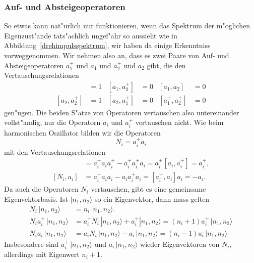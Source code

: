 \subsubsection{Auf- und Absteigeoperatoren}
So etwas kann nat"urlich nur funktionieren, wenn das Spektrum der
m"oglichen Eigenzust"ande tats"achlich ungef"ahr so aussieht wie in
Abbildung~\ref{drehimpulsspektrum}, wir haben da einige Erkenntniss
vorweggenommen.
Wir nehmen also an, dass es zwei Paare von Auf- und Absteigeoperatoren
$a_1^+$ und $a_1$ und $a_2^+$ und $a_2$ gibt, die den Vertauschungsrelationen
\begin{align*}
[a_1,a_1^+]&=1&[a_1,a_2^+]&=0&[a_1,a_2]&=0\\
[a_2,a_2^+]&=1&[a_2,a_1^+]&=0&[a_1^+,a_2^+]&=0
\end{align*}
gen"ugen.
Die beiden S"atze von Operatoren vertauschen also untereinander
vollst"andig, nur die Operatorn $a_i$ und $a_i^+$ vertauschen nicht.
Wie beim harmonischen Oszillator bilden wir die Operatoren
\[
N_i=a_i^+a_i
\]
mit den Vertauschungsrelationen
\begin{align*}
[N_i,a_i^+]
&=
a_i^+a_ia_i^+-a_i^+a_i^+a_i
=
a_i^+[a_i,a_i^+]
=
a_i^+,
\\
[N_i,a_i]
&=
a_i^+a_ia_i- a_ia_i^+a_i
=
[a_i^+,a_i]a_i
=
-a_i.
\end{align*}
Da auch die Operatoren $N_i$ vertauschen, gibt es eine gemeinsame
Eigenvektorbasis. Ist $|n_1,n_2\rangle$ so ein Eigenvektor, dann muss
gelten
\begin{align*}
N_i\,|n_1,n_2\rangle
&=
n_i\,|n_1,n_2\rangle.
\\
N_ia_i^+\,|n_1,n_2\rangle
&=
a_i^+N_i\,|n_1,n_2\rangle+a_i^+|n_1,n_2\rangle
=
(n_i+1)a_i^+\,|n_1,n_2\rangle
\\
N_ia_i\,|n_1,n_2\rangle
&=
a_iN_i\,|n_1,n_2\rangle-a_i\,|n_1,n_2\rangle
=
(n_i-1)a_i\,|n_1,n_2\rangle
\end{align*}
Insbesondere sind $a_i^+\,|n_1,n_2\rangle$ und $a_i\,|n_1,n_2\rangle$
wieder Eigenvektoren von $N_i$, allerdings mit Eigenwert $n_i+1$.

